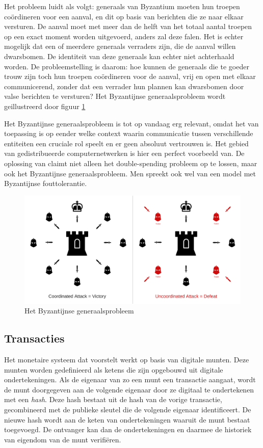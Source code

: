 			Het probleem luidt als volgt: generaals van Byzantium moeten hun troepen coördineren voor een aanval, en dit op basis van berichten die ze naar elkaar versturen. De aanval moet met meer dan de helft van het totaal aantal troepen op een exact moment worden uitgevoerd, anders zal deze falen. Het is echter mogelijk dat een of meerdere generaals verraders zijn, die de aanval willen dwarsbomen. De identiteit van deze generaals kan echter niet achterhaald worden. De probleemstelling is daarom: hoe kunnen de generaals die te goeder trouw zijn toch hun troepen coördineren voor de aanval, vrij en open met elkaar communicerend, zonder dat een verrader hun plannen kan dwarsbomen door valse berichten te versturen? Het Byzantijnse generaalsprobleem wordt geillustreerd door figuur \ref{fig:byzantium}
			
			Het Byzantijnse generaalsprobleem is tot op vandaag erg relevant, omdat het van toepassing is op eender welke context waarin communicatie tussen verschillende entiteiten een cruciale rol speelt en er geen absoluut vertrouwen is. Het gebied van gedistribueerde computernetwerken is hier een perfect voorbeeld van. De oplossing van \textcite{Nakamoto2008} claimt niet alleen het double-spending probleem op te lossen, maar ook het Byzantijnse generaalsprobleem. Men spreekt ook wel van een model met Byzantijnse fouttolerantie.
			
			\begin{figure}
				\includegraphics[width=\linewidth]{img/byzantine_generals.png}
				\caption{Het Byzantijnse generaalsprobleem~\autocite{Humanjets2018}}
				\label{fig:byzantium}
			\end{figure}
			
	\subsection{Transacties}
	Het monetaire systeem dat \textcite{Nakamoto2008} voorstelt werkt op basis van digitale munten. Deze munten worden gedefinieerd als ketens die zijn opgebouwd uit digitale ondertekeningen. Als de eigenaar van zo een munt een transactie aangaat, wordt de munt doorgegeven aan de volgende eigenaar door ze digitaal te ondertekenen met een \textit{hash}. Deze hash bestaat uit de hash van de vorige transactie, gecombineerd met de publieke sleutel die de volgende eigenaar identificeert. De nieuwe hash wordt aan de keten van ondertekeningen waaruit de munt bestaat toegevoegd. De ontvanger kan dan de ondertekeningen en daarmee de historiek van eigendom van de munt verifiëren. 
			
